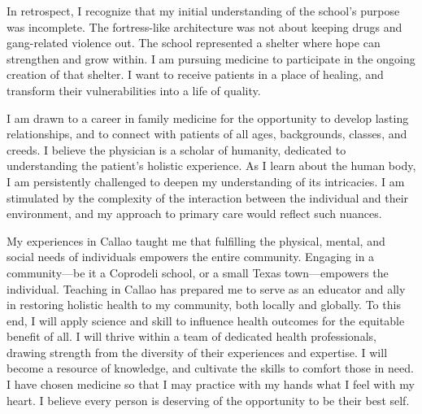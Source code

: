 \documentclass[12pt,a4paper,roman]{moderncv} %
\begin{document}
\medskip

In retrospect, I recognize that my initial understanding of the school's purpose was incomplete. The fortress-like architecture was not about keeping drugs and gang-related violence out. The school represented a shelter where hope can strengthen and grow within. I am pursuing medicine to participate in the ongoing creation of that shelter. I want to receive patients in a place of healing, and transform their vulnerabilities into a life of quality.

\medskip

I am drawn to a career in family medicine for the opportunity to develop lasting relationships, and to connect with patients of all ages, backgrounds, classes, and creeds. I believe the physician is a scholar of humanity, dedicated to understanding the patient's holistic experience. As I learn about the human body, I am persistently challenged to deepen my understanding of its intricacies. I am stimulated by the complexity of the interaction between the individual and their environment, and my approach to primary care would reflect such nuances. 

\medskip

My experiences in Callao taught me that fulfilling the physical, mental, and social needs of individuals empowers the entire community. Engaging in a community---be it a Coprodeli school, or a small Texas town---empowers the individual. Teaching in Callao has prepared me to serve as an educator and ally in restoring holistic health to my community, both locally and globally. To this end, I will apply science and skill to influence health outcomes for the equitable benefit of all. I will thrive within a team of dedicated health professionals, drawing strength from the diversity of their experiences and expertise. I will become a resource of knowledge, and cultivate the skills to comfort those in need. I have chosen medicine so that I may practice with my hands what I feel with my heart. I believe every person is deserving of the opportunity to be their best self. 
\end{document}
